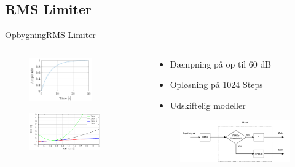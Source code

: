 \subsection{RMS Limiter}
\begin{frame}{Opbygning}{RMS Limiter}

\begin{columns}
  \begin{column}{0.5\textwidth}
\begin{figure}
\centering
\includegraphics[width=0.7\textwidth]{releaseTimeDigitalStep}
\end{figure}
\vspace{-5mm}
\begin{figure}
\includegraphics[width=0.8\textwidth]{BandModelCombine}
\end{figure}
  \end{column}
  \begin{column}{0.5\textwidth}
\begin{itemize}
\item Dæmpning på op til 60 dB
\item Opløsning på 1024 Steps
\item Udskiftelig modeller
\end{itemize}
\begin{figure}
\centering
\includegraphics[width=\textwidth]{designRealRMS}
\end{figure}
  \end{column}
\end{columns}

\end{frame}
